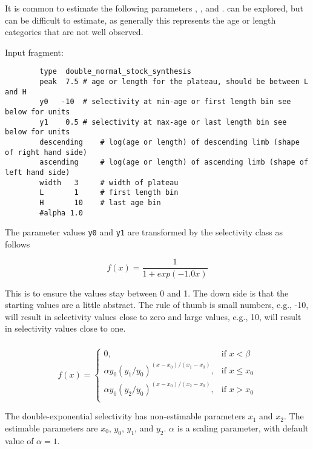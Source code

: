 It is common to estimate the following parameters , ,  and .  can be explored, but can be difficult to estimate, as generally this represents the age or length categories that are not well observed.

Input fragment: {\small{\begin{verbatim}
		type  double_normal_stock_synthesis
		peak  7.5 # age or length for the plateau, should be between L and H
		y0	 -10  # selectivity at min-age or first length bin see below for units
		y1	  0.5 # selectivity at max-age or last length bin see below for units
		descending 	  # log(age or length) of descending limb (shape of right hand side) 
		ascending 	  # log(age or length) of ascending limb (shape of left hand side) 
		width   3     # width of plateau
		L  		1     # first length bin
		H 		10    # last age bin
		#alpha 1.0
		\end{verbatim}}}

The parameter values \texttt{y0} and \texttt{y1} are transformed by the selectivity class as follows

\[
f(x) = \frac{1}{1+exp(-1.0 x )}
\] 

This is to ensure the values stay between 0 and 1. The down side is that the starting values are a little abstract. The rule of thumb is small numbers, e.g., -10, will result in selectivity values close to zero and large values, e.g., 10, will result in selectivity values close to one.

\subsubsection[Double-exponential]{}\label{sec:Selectivity-DoubleExponential}

\begin{equation}
f(x)=\begin{cases}
	  0, & \text{if $x < \beta$} \\
	  \alpha y_0(y_1 / y_0)^{(x-x_0)/(x_1-x_0)}, & \text{if $x \le x_0$} \\
	  \alpha y_0(y_2 / y_0)^{(x-x_0)/(x_2-x_0)}, & \text{if $x > x_0$} \\
  \end{cases}
\end{equation}

The double-exponential selectivity has non-estimable parameters $x_1$ and $x_2$. The estimable parameters are $x_0$, $y_0$, $y_1$, and $y_2$.  $\alpha$ is a scaling parameter, with default value of $\alpha = 1$. 

